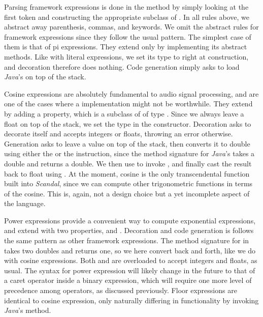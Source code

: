 Parsing framework expressions is done in the  method by simply looking at the first token and constructing the appropriate subclass of . In all rules above, we abstract away parenthesis, commas, and keywords. We omit the abstract rules for framework expressions since they follow the usual pattern. The simplest case of them is that of pi expressions. They extend  only by implementing its abstract methods. Like with literal expressions, we set its type to  right at construction, and decoration therefore does nothing. Code generation simply asks  to load \emph{Java}'s  on top of the stack.

Cosine expressions are absolutely fundamental to audio signal processing, and are one of the cases where a  implementation might not be worthwhile. They extend  by adding a  property, which is a subclass of  of type . Since we always leave a float on top of the stack, we set the type in the constructor. Decoration asks  to decorate itself and accepts integers or floats, throwing an error otherwise. Generation asks  to leave a value on top of the stack, then converts it to double using either the  or the  instruction, since the method signature for \emph{Java}'s  takes a double and returns a double. We then use  to invoke , and finally cast the result back to float using . At the moment, cosine is the only transcendental function built into \emph{Scandal}, since we can compute other trigonometric functions in terms of the cosine. This is, again, not a design choice but a yet incomplete aspect of the language.

Power expressions provide a convenient way to compute exponential expressions, and extend  with two properties,  and . Decoration and code generation is follows the same pattern as other framework expressions. The method signature for  in  takes two doubles and returns one, so we here convert back and forth, like we do with cosine expressions. Both  and  are overloaded to accept integers and floats, as usual. The syntax for power expression will likely change in the future to that of a caret operator inside a binary expression, which will require one more level of precedence among operators, as discussed previously. Floor expressions are identical to cosine expression, only naturally differing in functionality by invoking \emph{Java}'s  method.

